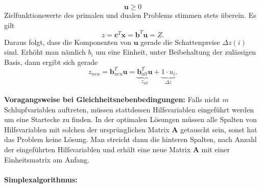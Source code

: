 		\[\bm{u} \geq 0\]
		Zielfunktionswerte des primalen und dualen Problems stimmen stets überein. Es gilt
		\[z = \bm{c}^{T}\bm{x} = \bm{b}^{T}\bm{u} = Z.\]
		Daraus folgt, dass die Komponenten von $ \bm{u} $ gerade die Schattenpreise $ \Delta z(i) $ sind. Erhöht man nämlich $ b_{i} $ um eine Einheit, unter Beibehaltung der zulässigen Basis, dann ergibt sich gerade
		\[z_{neu} = \bm{b}^{T}_{neu}\bm{u} = \underbrace{\bm{b}^{T}_{alt}\bm{u}}_{z_{alt}} + \underbrace{1\cdot u_{i}}_{\Delta z}.\]
		\leavevmode \\
		\textbf{Voragangsweise bei Gleichheitsnebenbedingungen:} Falls nicht $ m $ Schlupfvariablen auftreten, müssen stattdessen Hilfsvariablen eingeführt werden um eine Startecke zu finden. In der optimalen Lösungen müssen alle Spalten von Hilfsvariablen mit solchen der ursprünglichen Matrix $ \bm{A} $ getauscht sein, sonst hat das Problem keine Lösung. Man streicht dann die hinteren Spalten, nach Anzahl der eingeführten Hilfsvariablen und erhält eine neue Matrix $ \bm{A} $ mit einer Einheitsmatrix am Anfang. 
		\leavevmode \\\\
		\textbf{Simplexalgorithmus:}
		
		
